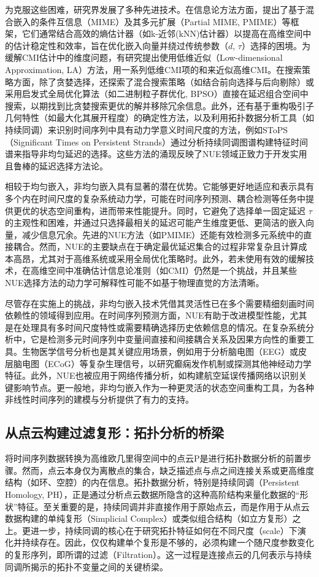 为克服这些困难，研究界发展了多种先进技术。在信息论方法方面，提出了基于混合嵌入的条件互信息（MIME）及其多元扩展（Partial MIME, PMIME）等框架，它们通常结合高效的熵估计器（如k-近邻(kNN)估计器）以提高在高维空间中的估计稳定性和效率，旨在优化嵌入向量并绕过传统参数（$d$, $\tau$）选择的困境。为缓解CMI估计中的维度问题，有研究提出使用低维近似（Low-dimensional Approximation, LA）方法，用一系列低维CMI项的和来近似高维CMI。在搜索策略方面，除了贪婪选择，还探索了混合搜索策略（如结合前向选择与后向剔除）或采用启发式全局优化算法（如二进制粒子群优化, BPSO）直接在延迟组合空间中搜索，以期找到比贪婪搜索更优的解并移除冗余信息。此外，还有基于重构吸引子几何特性（如最大化其展开程度）的确定性方法，以及利用拓扑数据分析工具（如持续同调）来识别时间序列中具有动力学意义时间尺度的方法，例如SToPS（Significant Times on Persistent Strands）通过分析持续同调图谱构建特征时间谱来指导非均匀延迟的选择。这些方法的涌现反映了NUE领域正致力于开发实用且鲁棒的延迟选择方法论。

相较于均匀嵌入，非均匀嵌入具有显著的潜在优势。它能够更好地适应和表示具有多个内在时间尺度的复杂系统动力学，可能在时间序列预测、耦合检测等任务中提供更优的状态空间重构，进而带来性能提升。同时，它避免了选择单一固定延迟 $\tau$ 的主观性和困难，并通过只选择最相关的延迟可能产生维度更低、更简洁的嵌入向量，减少信息冗余。先进的NUE方法（如PMIME）还能有效检测多元系统中的直接耦合。然而，NUE的主要缺点在于确定最优延迟集合的过程非常复杂且计算成本高昂，尤其对于高维系统或采用全局优化策略时。此外，若未使用有效的缓解技术，在高维空间中准确估计信息论准则（如CMI）仍然是一个挑战，并且某些NUE选择方法的动力学可解释性可能不如基于物理直觉的方法清晰。

尽管存在实施上的挑战，非均匀嵌入技术凭借其灵活性已在多个需要精细刻画时间依赖性的领域得到应用。在时间序列预测方面，NUE有助于改进模型性能，尤其是在处理具有多时间尺度特性或需要精确选择历史依赖信息的情况。在复杂系统分析中，它是检测多元时间序列中变量间直接和间接耦合关系及因果方向性的重要工具。生物医学信号分析也是其关键应用场景，例如用于分析脑电图（EEG）或皮层脑电图（ECoG）等复杂生理信号，以研究癫痫发作机制或探测其他神经动力学特征。此外，NUE也被应用于网络传播分析，如构建航空延误传播网络以识别关键影响节点。更一般地，非均匀嵌入作为一种更灵活的状态空间重构工具，为各种非线性时间序列的建模与分析提供了有力的支持。

\subsection{从点云构建过滤复形：拓扑分析的桥梁} %
将时间序列数据转换为高维欧几里得空间中的点云P是进行拓扑数据分析的前置步骤。然而，点云本身仅为离散点的集合，缺乏描述点与点之间连接关系或更高维度结构（如环、空腔）的内在信息。拓扑数据分析，特别是持续同调（Persistent Homology, PH），正是通过分析点云数据所隐含的这种高阶结构来量化数据的“形状”特征。至关重要的是，持续同调并非直接作用于原始点云，而是作用于从点云数据构建的单纯复形（Simplicial Complex）或类似组合结构（如立方复形）之上。更进一步，持续同调的核心在于研究拓扑特征如何在不同尺度（scale）下演化并持续存在。因此，仅仅构建单个复形是不够的，必须构建一个随尺度参数变化的复形序列，即所谓的过滤（Filtration）。这一过程是连接点云的几何表示与持续同调所揭示的拓扑不变量之间的关键桥梁。

